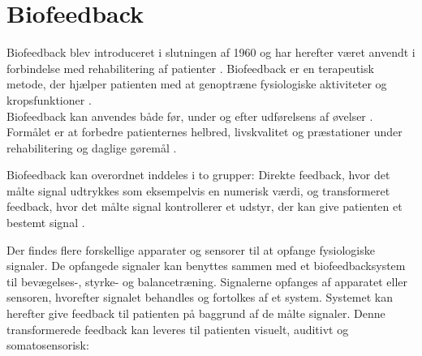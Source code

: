 \section{Biofeedback}
Biofeedback blev introduceret i slutningen af 1960 og har herefter været anvendt i forbindelse med rehabilitering af patienter \cite{Glanz1995, Prentice2007}. Biofeedback er en terapeutisk metode, der hjælper patienten med at genoptræne fysiologiske aktiviteter og kropsfunktioner \cite{Prentice2007}. \\
Biofeedback kan anvendes både før, under og efter udførelsens af øvelser \cite{Prentice2007, Giggins2013}. Formålet er at forbedre patienternes helbred, livskvalitet og præstationer under rehabilitering og daglige gøremål \cite{Prentice2007}. 

Biofeedback kan overordnet inddeles i to grupper: Direkte feedback, hvor det målte signal udtrykkes som eksempelvis en numerisk værdi, og transformeret feedback, hvor det målte signal kontrollerer et udstyr, der kan give patienten et bestemt signal \cite{Giggins2013}.


Der findes flere forskellige apparater og sensorer til at opfange fysiologiske signaler. De opfangede signaler kan benyttes sammen med et biofeedbacksystem til bevægelses-, styrke- og balancetræning. Signalerne opfanges af apparatet eller sensoren, hvorefter signalet behandles og fortolkes af et system. Systemet kan herefter give feedback til patienten på baggrund af de målte signaler. \cite{Prentice2007} Denne  transformerede feedback kan leveres til patienten visuelt, auditivt og somatosensorisk:


